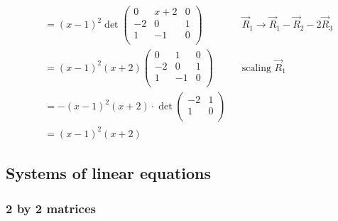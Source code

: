 \documentclass{../template/note}
\begin{document}
\begin{example}
\begin{align*}
            &= (x-1)^2 \det \begin{pmatrix}
             0 & x+2 & 0 \\
             -2 & 0 & 1 \\
             1 & -1 & 0 \\
            \end{pmatrix} && \vec R_1 \to \vec R_1 - \vec R_2 - 2 \vec R_3 \\
            &= (x-1)^2(x+2) \begin{pmatrix}
             0 & 1 & 0 \\
             -2 & 0 & 1 \\
             1 & -1 & 0 \\
            \end{pmatrix} && \text{scaling } \vec R_1 \\
            &= -(x-1)^2(x+2) \cdot \det \begin{pmatrix}
             -2 & 1 \\
             1 & 0 \\
            \end{pmatrix} \\
            &= (x-1)^2(x+2)
        \end{align*}
    \end{example}
    
    \subsection{Systems of linear equations}

    \subsubsection{2 by 2 matrices}
\end{document}
